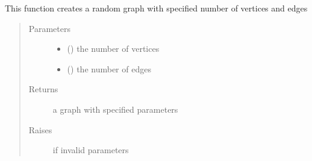 \documentclass[letterpaper,10pt,english]{sphinxmanual}
\begin{document}
\begin{fulllineitems}
\label{\detokenize{Graph:Graph.random_graph}}
This function creates a random graph with specified number of vertices and edges
\begin{quote}\begin{description}
\item[{Parameters}] \leavevmode\begin{itemize}
\item {} 
 () \textendash{} the number of vertices

\item {} 
 () \textendash{} the number of edges

\end{itemize}

\item[{Returns}] \leavevmode
a graph with specified parameters

\item[{Raises}] \leavevmode
{} \textendash{} if invalid parameters

\end{description}\end{quote}

\end{fulllineitems}

\end{document}
